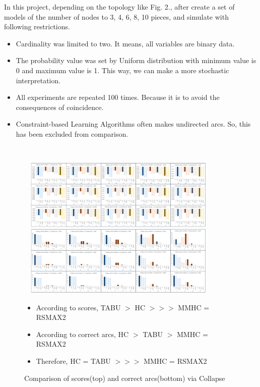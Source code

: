 \documentclass[runningheads,a4paper]{llncs}
\begin{document}
In this project, depending on the topology like Fig. 2., after create a set of models of the number of nodes to 3, 4, 6, 8, 10 pieces, and simulate with following restrictions.

\begin{itemize}
	\item Cardinality was limited to two. It means, all variables are binary data.
	
	\item  The probability value was set by Uniform distribution with minimum value is 0 and maximum value is 1. This way, we can make a more stochastic interpretation.
	
	\item All experiments are repeated 100 times. Because it is to avoid the consequences of coincidence.
	
	\item Constraint-based Learning Algorithms often makes undirected arcs. So, this has been excluded from comparison.
\end{itemize}
  
{}\
  
	\begin{figure}
		\centering
		\includegraphics[width=280pt, height=95pt]{images/01_Collapse_Score}
		\includegraphics[width=280pt, height=95pt]{images/01_Collapse_Arcs}
		\caption{Comparison of scores(top) and correct arcs(bottom) via Collapse}
		{
			\begin{itemize}
				\item According to scores, TABU $>$ HC $>>>$ MMHC = RSMAX2
				
				\item According to correct arcs, HC $>$ TABU $>$ MMHC = RSMAX2
					
				\item Therefore, {\color{red}HC = TABU $>>>$ MMHC = RSMAX2}
			\end{itemize}
		}
	\end{figure}
	
\end{document}
